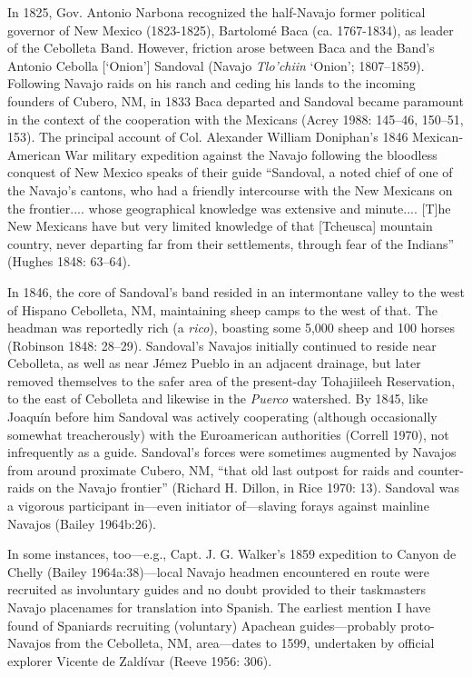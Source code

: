 In 1825, Gov. Antonio Narbona recognized the half-Navajo former political governor of New Mexico (1823-1825), Bartolomé Baca (ca. 1767-1834), as leader of the Cebolleta Band.  However, friction arose between Baca and the Band’s Antonio Cebolla [‘Onion’] Sandoval (Navajo \textit{Tlo’chiin} ‘Onion’; 1807–1859).  Following Navajo raids on his ranch and ceding his lands to the incoming founders of Cubero, NM, in 1833 Baca departed and Sandoval became paramount in the context of the cooperation with the Mexicans (Acrey 1988: 145–46, 150–51, 153).  The principal account of Col. Alexander William Doniphan’s 1846 Mexican-American War military expedition against the Navajo following the bloodless conquest of New Mexico speaks of their guide “Sandoval, a noted chief of one of the Navajo’s cantons, who had a friendly intercourse with the New Mexicans on the frontier.... whose geographical knowledge was extensive and minute....  [T]he New Mexicans have but very limited knowledge of that [Tcheusca] mountain country, never departing far from their settlements, through fear of the Indians” (Hughes 1848: 63–64).

In 1846, the core of Sandoval’s band resided in an intermontane valley to the west of Hispano Cebolleta, NM, maintaining sheep camps to the west of that.  The headman was reportedly rich (a \textit{rico}), boasting some 5,000 sheep and 100 horses (Robinson 1848: 28–29).  Sandoval’s Navajos initially continued to reside near Cebolleta, as well as near Jémez Pueblo in an adjacent drainage, but later removed themselves to the safer area of the present-day Tohajiileeh Reservation, to the east of Cebolleta and likewise in the \textit{Puerco} watershed.  By 1845, like Joaquín before him Sandoval was actively cooperating (although occasionally somewhat treacherously) with the Euroamerican authorities (Correll 1970), not infrequently as a guide.  Sandoval’s forces were sometimes augmented by Navajos from around proximate Cubero, NM, “that old last outpost for raids and counter-raids on the Navajo frontier” (Richard H. Dillon, in Rice 1970: 13).  Sandoval was a vigorous participant in—even initiator of—slaving forays against mainline Navajos (Bailey 1964b:26).

  In some instances, too—e.g., Capt. J. G. Walker’s 1859 expedition to Canyon de Chelly (Bailey 1964a:38)—local Navajo headmen encountered en route were recruited as involuntary guides and no doubt provided to their taskmasters Navajo placenames for translation into Spanish.  The earliest mention I have found of Spaniards recruiting (voluntary) Apachean guides—probably proto-Navajos from the Cebolleta, NM, area—dates to 1599, undertaken by official explorer Vicente de Zaldívar (Reeve 1956: 306).

